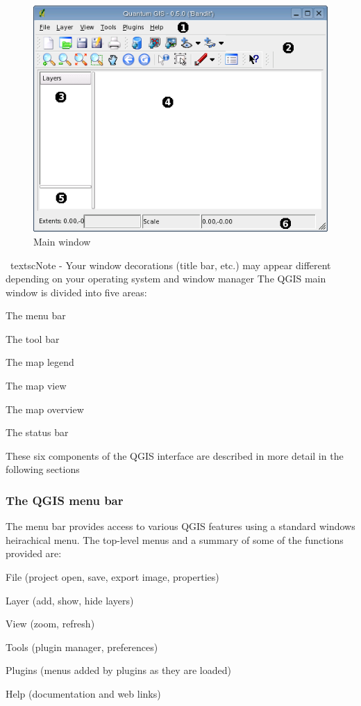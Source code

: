 \documentclass[10pt,english]{article}
\begin{document}
\begin{onehalfspace}
\begin{figure}[h]
   \begin{center}
   \caption{Main window}\label{fig:startup}
   \includegraphics[scale=.9]{qgis_user_guide_images/startup}
\end{center}  
   
\end{figure}
\
textsc{Note - Your window decorations (title bar, etc.) may appear different depending on your operating system and window manager}
The QGIS main window is divided into five areas:
\begin{compactenum}
\item The menu bar
\item The tool bar
\item The map legend
\item The map view
\item The map overview
\item The status bar
\end{compactenum}

These six components of the QGIS interface are described in more detail in the following sections
\subsubsection{The QGIS menu bar}

The menu bar provides access to various QGIS features using a standard windows
heirachical menu. The top-level menus and a summary of some of the functions provided are:
\begin{compactitem}
\item File (project open, save, export image, properties)
\item Layer (add, show, hide layers)
\item View (zoom, refresh)
\item Tools (plugin manager, preferences)
\item Plugins (menus added by plugins as they are loaded)
\item Help (documentation and web links)
\end{compactitem}


\end{onehalfspace}
\end{document}
